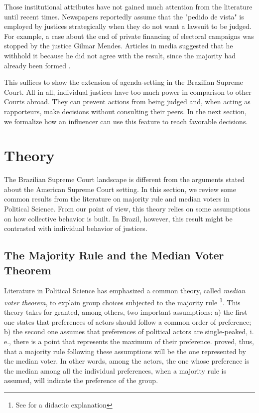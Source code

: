 \documentclass[12pt, a4paper]{article}
\begin{document}
\begin{enumerate}
Those institutional attributes have not gained much attention from the literature until recent times. Newspapers reportedly assume that the "pedido de vista" is employed by justices strategically when they do not want a lawsuit to be judged. For example, a case about the end of private financing of electoral campaigns was stopped by the justice Gilmar Mendes. Articles in media suggested that he withhold it because he did not agree with the result, since the majority had already been formed \citep{pedidodevistagilmar}.

\end{enumerate}

This suffices to show the extension of agenda-setting in the Brazilian Supreme Court. All in all, individual justices have too much power in comparison to other Courts abroad. They can prevent actions from being judged and, when acting as rapporteurs, make decisions without consulting their peers. In the next section, we formalize how an influencer can use this feature to reach favorable decisions. 




\section{Theory}
\label{theory}

The Brazilian Supreme Court landscape is different from the arguments 
stated about the American Supreme Court setting. 
In this section, we review some common results from the literature 
on majority rule and median voters in Political Science. 
From our point of view, this theory relies on some assumptions on
how collective behavior is built. In Brazil, however, 
this result might be contrasted with individual behavior of justices.

\subsection{The Majority Rule and the Median Voter Theorem}

Literature in Political Science has emphasized a common theory, called \emph{median voter theorem}, 
to explain group choices subjected to the majority rule 
\citep{black1948rationale}\footnote{See \citet{shepsle1996analyzing} 
for a didactic explanation}. This theory takes for granted, 
among others, two important assumptions: a) the first one states that preferences of
actors should follow a common order of preference; 
b) the second one assumes that preferences of political actors are single-peaked, 
i. e., there is a point that represents the maximum of their preference. \citet{black1948rationale}
proved, thus, that a majority rule following these assumptions will 
be the one represented by the median voter. In other words, among the actors, 
the one whose preference is the median among all the individual preferences, 
when a majority rule is assumed, will indicate the preference of the group.
\end{document}
